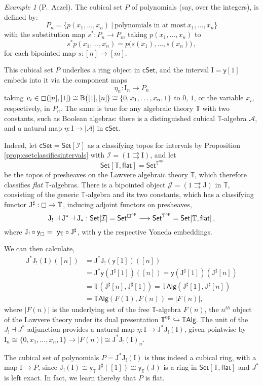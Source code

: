 \documentclass[11pt,reqno]{amsart}
\newcommand{\C}{\ensuremath{\boxempty}}
\newcommand{\B}{\ensuremath{\mathbb{B}}}
\newcommand{\T}{\ensuremath{\mathbb{T}}}
\newcommand{\psh}[1]{\ensuremath{\mathsf{Set}^{#1^{\mathrm{op}}}}}
\newcommand{\Set}{\ensuremath{\mathsf{Set}}}
\newcommand{\cSet}{\ensuremath{\mathsf{cSet}}}
\newcommand{\y}{\ensuremath{\mathsf{y}}} %
\newcommand{\op}[1]{\ensuremath{{#1}^{\mathrm{op}}}}
\newcommand{\hook}{\ensuremath{\hookrightarrow}}
\renewcommand{\to}{\ensuremath{\rightarrow}}
\newcommand{\too}{\ensuremath{\longrightarrow}}
\newcommand{\I}{\ensuremath{\mathrm{I}}}
\newcommand{\J}{\ensuremath{\mathrm{J}}}
\theoremstyle{remark}
\newtheorem{example}[theorem]{Example}
\theoremstyle{definition}
\begin{document}
%
\begin{example}[P.~Aczel]
The cubical set $P$ of polynomials (say, over the integers), is defined by:
\[
P_n = \{ p(x_1, ...,  x_n)\ |\  \text{polynomials in at most}\  x_1, ..., x_n \}
\]
with the substitution map $s^* : P_n \to P_m$ taking $p(x_1, ...,  x_n)$ to 
\[
 s^*p(x_1, ...,  x_n) = p\big(s(x_1),\dots, s(x_n)\big) \,,
\]
for each bipointed map $s:[n] \to [m]$.

This cubical set $P$ underlies a ring object in $\cSet$, and the interval $\I = \y[1]$ embeds into it via the component maps
\[
\eta_n : \I_n \to P_n
\]
taking $v_i \in \C([n], [1])\cong \B\big([1],[n]\big) \cong \{0, x_1, \dots, x_n, 1\} $ to $0$, $1$, or the variable $x_i$, respectively, in $P_n$.
The same is true for any algebraic theory $\T$ with two constants, 
such as Boolean algebras: there is a distinguished cubical $\T$-algebra $\mathcal{A}$, and a natural map $\eta : \I \to |\mathcal{A}|$ in $\cSet$.

Indeed, let $\cSet = \Set[\mathcal{I}]$ as a classifying topos for intervals by Proposition \ref{prop:csetclassifiesintervals} with $\mathcal{I} = (1\rightrightarrows \I)$, and let
\[
\Set[\T,\mathsf{flat}]= \Set^{\op{\T}}
\]
 be the topos of presheaves on the Lawvere algebraic theory $\T$, which therefore classifies \emph{flat} $\T$-algebras.  There is a bipointed object $\mathcal{J} = (1\rightrightarrows \J)$ in $\T$, consisting of the generic $\T$-algebra and its two constants, which has a classifying functor $\J^\sharp : \C \to \T$, inducing adjoint functors on presheaves, 
\[
\J_! \dashv \J^* \dashv \J_* : \Set[\mathcal{I}] = \psh{\C} \too \psh{\T} = \Set[\T,\mathsf{flat}]\,,
\]
where $\J_! \circ \y_{\C} =\ \y_{\T} \circ \J^\sharp$,  with $\y$ the respective Yoneda embeddings.

We can then calculate,
\begin{equation}
\begin{split}
\J^* \J_! ( \I )( [n] ) &= \J^* \J_! ( \y[1] )( [n] )\\
 &= \J^* \y( \J^\sharp[1] )( [n] ) = \y( \J^\sharp[1] )( \J^\sharp[n] ) \\
 &= \T( \J^\sharp[n] , \J^\sharp[1] ) = \T\mathsf{Alg}( \J^\sharp[1] , \J^\sharp[n] ) \\
 &= \T\mathsf{Alg}( F(1) , F(n) ) = | F(n) |,
\end{split}
\end{equation}
where $|F(n)|$ is the underlying set of the free $\T$-algebra $F(n)$, the $n^{th}$ object of the Lawvere theory under its dual presentation $\op{\T}\hook \T\mathsf{Alg}$.  The unit of the $J_! \dashv J^*$ adjunction provides a natural map $\eta: \I \to \J^* \J_! ( \I )$, given pointwise by  $\I_n \cong   \{0, x_1, \dots, x_n, 1\} \too | F(n) | \cong \J^* \J_! ( \I )_n $.

The cubical set of polynomials $P = \J^* \J_! ( \I )$ is thus indeed a cubical ring, with a map $\I \to P$, since $\J_!(\I) \cong \y_\T\,\J^\sharp([1]) \cong \y_\T(\J)$ is a ring in $\Set[\T,\mathsf{flat}]$ and $J^*$ is left exact.  In fact, we learn thereby  that $P$ is flat.
\end{example}
\end{document}
